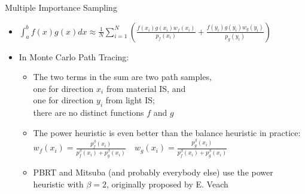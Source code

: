 \documentclass[utf8,stillsansserifmath,fleqn,t]{beamer}
\newcommand{\ds}{\displaystyle}
\begin{document}
\begin{frame}[label=mis-1]
\frametitle{\insertsection}
Multiple Importance Sampling
\begin{itemize}
\item $\ds \int_a^b f(x)g(x)dx \approx \frac{1}{N} \sum_{i=1}^{N} \left(\frac{f(x_i)g(x_i)w_f(x_i)}{p_f(x_i)}
+\frac{f(y_i)g(y_i)w_g(y_i)}{p_g(y_i)}\right)$
\item In Monte Carlo Path Tracing:
    \begin{itemize}
    \item The two terms in the sum are two path samples,\\
    one for direction $x_i$ from material IS, and\\
    one for direction $y_i$ from light IS;\\
    there are no distinct functions $f$ and $g$
    \item The power heuristic is even better than the balance heuristic in practice:\\
$\ds w_f(x_i)=\frac{p_f^\beta(x_i)}{p_f^\beta(x_i)+p_g^\beta(x_i)} \quad w_g(x_i)=\frac{p_g^\beta(x_i)}{p_f^\beta(x_i)+p_g^\beta(x_i)}$
    \item PBRT and Mitsuba (and probably everybody else) use the power heuristic with $\beta=2$,
    originally proposed by E. Veach
    \end{itemize}
\end{itemize}
\end{frame}
\end{document}
